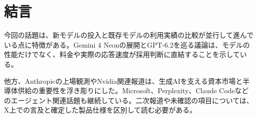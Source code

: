 \section{結言}
今回の話題は、新モデルの投入と既存モデルの利用実績の比較が並行して進んでいる点に特徴がある。Gemini 4 Neonの展開とGPT-6.2を巡る議論は、モデルの性能だけでなく、料金や実際の応答速度が採用判断に直結することを示している。

他方、Anthropicの上場観測やNvidia関連報道は、生成AIを支える資本市場と半導体供給の重要性を浮き彫りにした。Microsoft、Perplexity、Claude Codeなどのエージェント関連話題も継続している。二次報道や未確認の項目については、X上での言及と確定した製品仕様を区別して読む必要がある。
